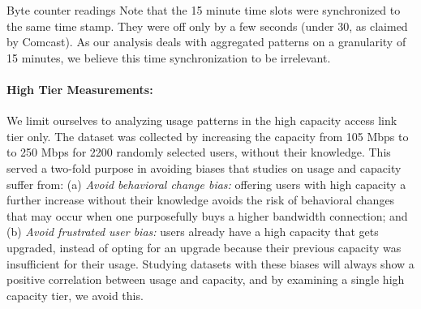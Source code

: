 Byte counter readings
Note that the 15 minute time slots were synchronized to the same time stamp. They were off only by a few seconds (under 30, as claimed by Comcast). As our analysis deals with aggregated patterns on a granularity of 15 minutes, we believe this time synchronization to be irrelevant.



\paragraph{High Tier Measurements:} We limit ourselves to analyzing usage patterns in the high capacity access link tier only. The \test dataset was collected by increasing the capacity from 105 Mbps to to 250 Mbps for 2200 randomly selected users, without their knowledge. This served a two-fold purpose in avoiding biases that studies on usage and capacity suffer from: (a) \emph{Avoid behavioral change bias:} offering users with high capacity a further increase without their knowledge avoids the risk of behavioral changes that may occur when one purposefully buys a higher bandwidth connection; and (b) \emph{Avoid frustrated user bias:} users already have a high capacity that gets upgraded, instead of opting for an upgrade because their previous capacity was insufficient for their usage. Studying datasets with these biases will always show a positive correlation between usage and capacity, and by examining a single high capacity tier, we avoid this.



